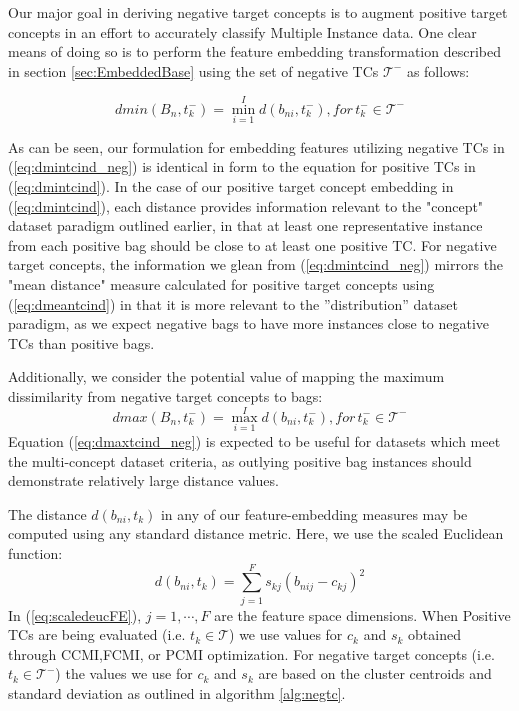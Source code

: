 \documentclass[12pt,dvips]{report}
\numberwithin{equation}{section}
\begin{document}
Our major goal in deriving negative target concepts is to augment positive target concepts in an effort to accurately classify Multiple Instance data. One clear means of doing so is to perform the feature embedding transformation described in section \ref{sec:EmbeddedBase} using the set of negative TCs $\mathcal{T}^{-}$ as follows: 

\begin{equation} \label{eq:dmintcind_neg}
dmin(B_{n},t^{-}_{k}) = \min_{i=1}^{I} d(b_{ni},t^{-}_{k}), for \, t^{-}_{k} \in \mathcal{T}^{-}
\end{equation}

As can be seen, our formulation for embedding features utilizing negative TCs in (\ref{eq:dmintcind_neg}) is identical in form to the equation for positive TCs in (\ref{eq:dmintcind}).  In the case of  our positive target concept embedding in (\ref{eq:dmintcind}), each distance provides information relevant to the "concept" dataset paradigm outlined earlier, in that at least one representative instance from each positive bag should be close to at least one positive TC. For negative target concepts, the information we glean from (\ref{eq:dmintcind_neg}) mirrors the "mean distance" measure calculated for positive target concepts using (\ref{eq:dmeantcind}) in that it  is more relevant to the ''distribution'' dataset paradigm, as we expect negative bags to have more instances close to negative TCs than positive bags.

Additionally, we consider the potential value of mapping the maximum dissimilarity from negative target concepts to bags:
\begin{equation} \label{eq:dmaxtcind_neg}
dmax(B_{n},t^{-}_{k}) = \max_{i=1}^{I} d(b_{ni},t^{-}_{k}), for \, t^{-}_{k} \in \mathcal{T}^{-}
\end{equation}
Equation (\ref{eq:dmaxtcind_neg}) is expected to be useful for datasets which meet the multi-concept dataset criteria, as outlying positive bag instances should demonstrate relatively large distance values.

The distance $d(b_{ni},t_{k})$ in any of our feature-embedding measures  may be computed using any standard distance metric.  Here, we use the scaled Euclidean function:
\begin{equation} \label{eq:scaledeucFE}
d(b_{ni},t_{k})=\sum_{j=1}^{F}s_{kj}(b_{nij}-c_{kj})^{2}
\end{equation}
In (\ref{eq:scaledeucFE}), $j=1, \cdots, F$ are the feature space dimensions.  When Positive TCs are being evaluated (i.e. $t_{k} \in \mathcal{T}$) we use values for $c_{k}$ and $s_{k}$ obtained through CCMI,FCMI, or PCMI optimization.  For negative target concepts (i.e. $t_{k} \in \mathcal{T}^{-}$) the values we use for $c_{k}$ and $s_{k}$ are based on the cluster centroids and standard deviation as outlined in algorithm \ref{alg:negtc}.  
\end{document}
